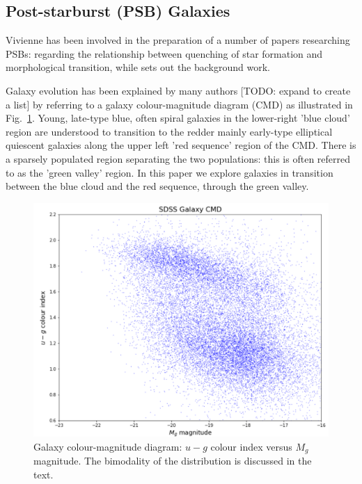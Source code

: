 \subsection{Post-starburst (PSB) Galaxies}
\label{sec:PSBs}
Vivienne has been involved in the preparation of a number of papers researching PSBs: \citet{2017MNRAS.472.1401A} regarding the relationship between quenching of star formation and morphological transition, while \citet{2016MNRAS.463..832W} sets out the background work.
\par Galaxy evolution has been explained by many authors [TODO: expand to create a list] \citep{baldry2004quantifying,2006MNRAS.373..469B} by referring to a galaxy colour-magnitude diagram (CMD) as illustrated in Fig.~\ref{fig:CMD1}. Young, late-type blue, often spiral galaxies in the lower-right 'blue cloud' region are understood to transition to the redder mainly early-type elliptical quiescent galaxies along the upper left 'red sequence' region of the CMD. There is a sparsely populated region separating the two populations: this is often referred to as the 'green valley' region. In this paper we explore galaxies in transition between the blue cloud and the red sequence, through the green valley.

\begin{figure}
	\includegraphics[width=\columnwidth]{images/CMDs/galaxyCMD.PNG}
    \caption{Galaxy colour-magnitude diagram: $u-g$ colour index versus $M_g$ magnitude. The bimodality of the distribution is discussed in the text.}
    \label{fig:CMD1}
\end{figure}